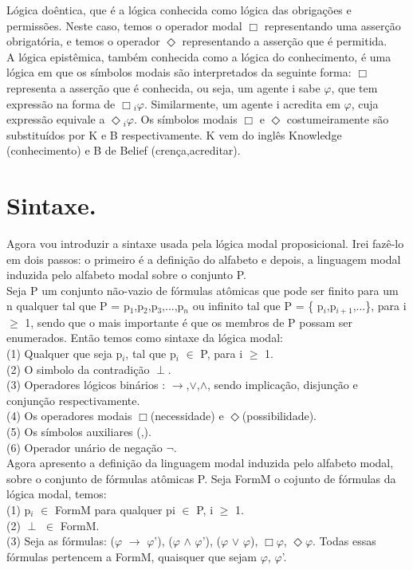 \documentclass[12pt]{report}
\begin{document}
       \indent Lógica doêntica, que é a lógica conhecida como lógica das obrigações e permissões. Neste caso, temos o operador modal $\Box$ representando uma asserção obrigatória, e temos o operador $\Diamond$ representando a asserção que é permitida.\\
          \indent A lógica epistêmica, também conhecida como a lógica do conhecimento, é uma lógica em que os símbolos modais são interpretados da seguinte forma: $\Box$ representa a asserção que é conhecida, ou seja, um agente i sabe $\varphi$, que tem expressão na forma de $\Box$$_{i}$$\varphi$. Similarmente, um agente i acredita  em $\varphi$, cuja expressão equivale a $\Diamond$$_{i}$$\varphi$. Os símbolos modais  $\Box$ e $\Diamond$ costumeiramente são substituídos por K e B respectivamente. K vem do inglês Knowledge (conhecimento) e B de Belief (crença,acreditar).\\
\section{Sintaxe.}
    \hspace{0.5cm} Agora vou introduzir a sintaxe usada pela lógica modal proposicional. Irei fazê-lo em dois passos: o primeiro é a definição do alfabeto e depois, a linguagem modal induzida pelo alfabeto modal sobre o conjunto P.\\
              \indent Seja P um conjunto não-vazio de fórmulas atômicas que pode ser  finito para um n qualquer tal que P = {p$_{1}$,p$_{2}$,p$_{3}$,...,p$_{n}$} ou infinito tal que P = \{ p$_{i}$,p$_{i+1}$,...\}, para i $\geq$ 1, sendo que o mais importante é que os membros de P possam ser enumerados. Então temos como sintaxe da lógica modal:\\
\indent (1) Qualquer que seja p$_{i}$, tal que p$_{i}$ $\in$ P, para  i $\geq$ 1.\\
\indent (2) O simbolo da contradição $\perp$.\\
\indent (3) Operadores lógicos binários : $\rightarrow$,$\vee$,$\land$, sendo implicação, disjunção e conjunção respectivamente.\\
\indent (4) Os operadores modais $\Box$(necessidade) e $\Diamond$(possibilidade).\\
\indent (5) Os símbolos auxiliares (,).\\
\indent (6) Operador unário de negação $\neg$.\\
             \indent Agora apresento a definição da linguagem modal induzida pelo alfabeto modal, sobre o conjunto de fórmulas atômicas P. Seja FormM o cojunto de fórmulas da lógica modal, temos: \\
\indent (1) p$_{i}$ $\in$ FormM para qualquer pi $\in$ P,  i $\geq$ 1.\\
\indent (2) $\perp$ $\in$ FormM.\\
\indent (3) Seja as fórmulas: ($\varphi$ $\rightarrow$ $\varphi$'), ($\varphi$ $\land$ $\varphi$'), ($\varphi$ $\vee$ $\varphi$), $\Box$$\varphi$, $\Diamond$$\varphi$. Todas essas fórmulas pertencem a FormM, quaisquer que sejam $\varphi$, $\varphi$'.\\ 
\end{document}
